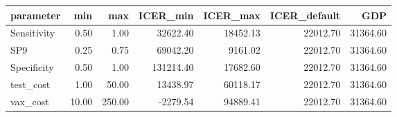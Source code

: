 \begin{tabular}{lrrrrrr}
  \hline
parameter & min & max & ICER\_min & ICER\_max & ICER\_default & GDP \\ 
  \hline
Sensitivity & 0.50 & 1.00 & 32622.40 & 18452.13 & 22012.70 & 31364.60 \\ 
  SP9 & 0.25 & 0.75 & 69042.20 & 9161.02 & 22012.70 & 31364.60 \\ 
  Specificity & 0.50 & 1.00 & 131214.40 & 17682.60 & 22012.70 & 31364.60 \\ 
  test\_cost & 1.00 & 50.00 & 13438.97 & 60118.17 & 22012.70 & 31364.60 \\ 
  vax\_cost & 10.00 & 250.00 & -2279.54 & 94889.41 & 22012.70 & 31364.60 \\ 
   \hline
\end{tabular}
